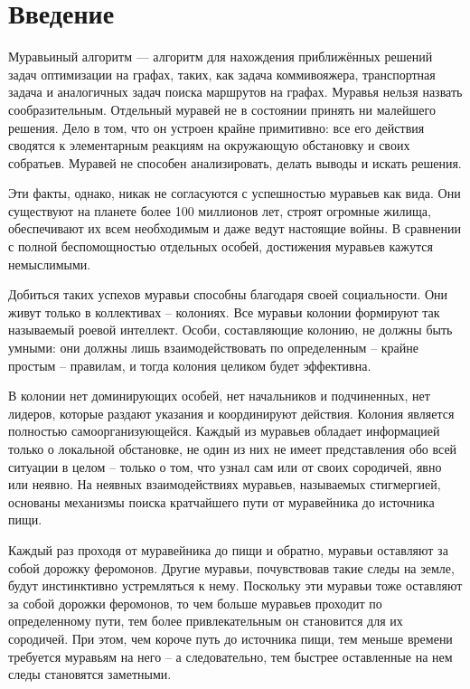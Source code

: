 \chapter*{Введение}

Муравьиный алгоритм — алгоритм для нахождения приближённых решений задач оптимизации на графах, таких, как задача коммивояжера, транспортная задача и аналогичных задач поиска маршрутов на графах.
Муравья нельзя назвать сообразительным.
Отдельный муравей не в состоянии принять ни малейшего решения.
Дело в том, что он устроен крайне примитивно: все его действия сводятся к элементарным реакциям на окружающую обстановку и своих собратьев.
Муравей не способен анализировать, делать выводы и искать решения.

Эти факты, однако, никак не согласуются с успешностью муравьев как вида.
Они существуют на планете более 100 миллионов лет, строят огромные жилища, обеспечивают их всем необходимым и даже ведут настоящие войны.
В сравнении с полной беспомощностью отдельных особей, достижения муравьев кажутся немыслимыми.

Добиться таких успехов муравьи способны благодаря своей социальности.
Они живут только в коллективах – колониях. Все муравьи колонии формируют так называемый роевой интеллект.
Особи, составляющие колонию, не должны быть умными: они должны лишь взаимодействовать по определенным – крайне простым – правилам, и тогда колония целиком будет эффективна.

В колонии нет доминирующих особей, нет начальников и подчиненных, нет лидеров, которые раздают указания и координируют действия.
Колония является полностью самоорганизующейся.
Каждый из муравьев обладает информацией только о локальной обстановке, не один из них не имеет представления обо всей ситуации в целом – только о том, что узнал сам или от своих сородичей, явно или неявно.
На неявных взаимодействиях муравьев, называемых стигмергией, основаны механизмы поиска кратчайшего пути от муравейника до источника пищи.

Каждый раз проходя от муравейника до пищи и обратно, муравьи оставляют за собой дорожку феромонов.
Другие муравьи, почувствовав такие следы на земле, будут инстинктивно устремляться к нему.
Поскольку эти муравьи тоже оставляют за собой дорожки феромонов, то чем больше муравьев проходит по определенному пути, тем более привлекательным он становится для их сородичей.
При этом, чем короче путь до источника пищи, тем меньше времени требуется муравьям на него – а следовательно, тем быстрее оставленные на нем следы становятся заметными.

